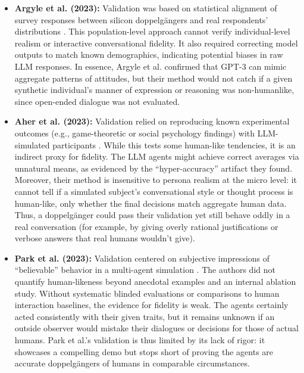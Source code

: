 \begin{itemize}
    \item \textbf{Argyle et al. (2023):} Validation was based on statistical alignment of survey responses between silicon doppelgängers and real respondents’ distributions \cite{argyle2023}. This population-level approach cannot verify individual-level realism or interactive conversational fidelity. It also required correcting model outputs to match known demographics, indicating potential biases in raw LLM responses. In essence, Argyle et al. confirmed that GPT-3 can mimic aggregate patterns of attitudes, but their method would not catch if a given synthetic individual’s manner of expression or reasoning was non-humanlike, since open-ended dialogue was not evaluated.

    \item \textbf{Aher et al. (2023):} Validation relied on reproducing known experimental outcomes (e.g., game-theoretic or social psychology findings) with LLM-simulated participants \cite{aher2023}. While this tests some human-like tendencies, it is an indirect proxy for fidelity. The LLM agents might achieve correct averages via unnatural means, as evidenced by the “hyper-accuracy” artifact they found. Moreover, their method is insensitive to persona realism at the micro level: it cannot tell if a simulated subject’s conversational style or thought process is human-like, only whether the final decisions match aggregate human data. Thus, a doppelgänger could pass their validation yet still behave oddly in a real conversation (for example, by giving overly rational justifications or verbose answers that real humans wouldn’t give).

    \item \textbf{Park et al. (2023):} Validation centered on subjective impressions of “believable” behavior in a multi-agent simulation \cite{Park2023}. The authors did not quantify human-likeness beyond anecdotal examples and an internal ablation study. Without systematic blinded evaluations or comparisons to human interaction baselines, the evidence for fidelity is weak. The agents certainly acted consistently with their given traits, but it remains unknown if an outside observer would mistake their dialogues or decisions for those of actual humans. Park et al.’s validation is thus limited by its lack of rigor: it showcases a compelling demo but stops short of proving the agents are accurate doppelgängers of humans in comparable circumstances.


\end{itemize}
